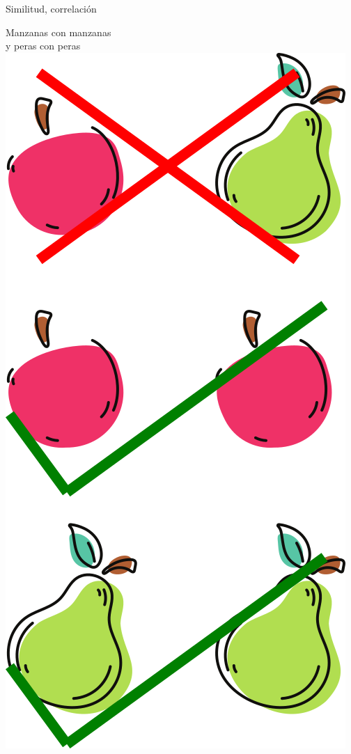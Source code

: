 \documentclass{beamer}
\begin{document}
\begin{frame}
 {Similitud, correlaci\'on}

 \begin{minipage}{0.45\linewidth}
 \centering Manzanas con manzanas \\
            y peras con peras \\
            \vskip 0.3cm
 \includegraphics[width=0.6\linewidth]{images/apples.png}
 \end{minipage}
 \begin{minipage}{0.4\linewidth}

\end{minipage}
\end{frame}
\end{document}
